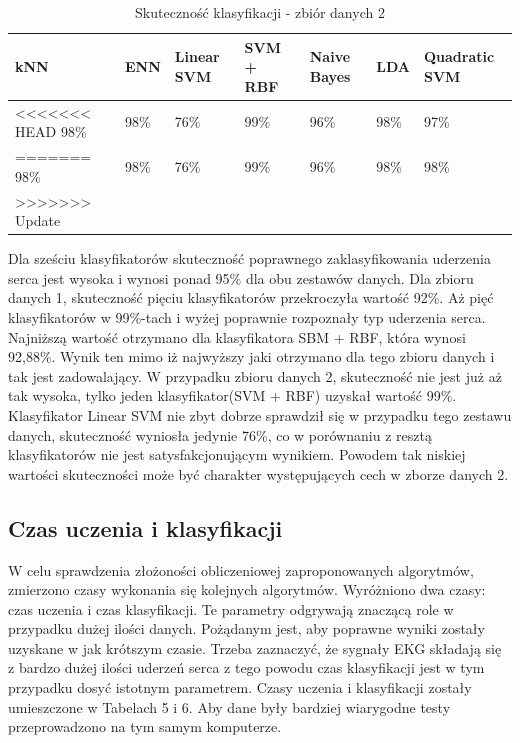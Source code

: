 \documentclass[[10pt,a4paper]{article}
\begin{document}
\begin{table}[h]
\centering
\caption{Skuteczność klasyfikacji - zbiór danych 2}
\label{accuracyTable1}
\begin{tabular}{|l|l|l|l|l|l|l|}
\hline
kNN & ENN & Linear SVM & SVM + RBF & Naive Bayes & LDA & Quadratic SVM\\ \hline
<<<<<<< HEAD
  98\%   &  98\%  & 76\%       & 99\%      & 96\%         & 98\%	& 97\%  \\ \hline
=======
  98\%   &  98\%  & 76\%       & 99\%      & 96\%         & 98\%	& 98\%  \\ \hline
>>>>>>> Update
\end{tabular}
\end{table}

Dla sześciu klasyfikatorów skuteczność poprawnego zaklasyfikowania uderzenia serca jest wysoka i wynosi ponad 95\% dla obu zestawów danych. Dla zbioru danych 1,  skuteczność pięciu klasyfikatorów przekroczyła wartość 92\%.  Aż pięć klasyfikatorów w 99\%-tach i wyżej poprawnie rozpoznały typ uderzenia serca. Najniższą wartość otrzymano dla klasyfikatora SBM + RBF, która wynosi 92,88\%. Wynik ten mimo iż najwyższy jaki otrzymano dla tego zbioru danych i tak jest zadowalający. W przypadku zbioru danych 2, skuteczność nie jest już aż tak wysoka, tylko jeden klasyfikator(SVM + RBF) uzyskał wartość 99\%. Klasyfikator Linear SVM nie zbyt dobrze sprawdził się w przypadku tego zestawu danych, skuteczność wyniosła jedynie 76\%, co w porównaniu z resztą klasyfikatorów nie jest satysfakcjonującym wynikiem. Powodem tak niskiej wartości skuteczności może być charakter występujących cech w zborze danych 2. 





\subsection{Czas uczenia i klasyfikacji}

W celu sprawdzenia złożoności obliczeniowej zaproponowanych algorytmów, zmierzono czasy wykonania się kolejnych algorytmów. Wyróżniono dwa czasy: czas uczenia i czas klasyfikacji. Te parametry odgrywają znaczącą role w przypadku dużej ilości danych. Pożądanym jest, aby poprawne wyniki zostały uzyskane w jak krótszym czasie. Trzeba zaznaczyć, że sygnały EKG składają się z bardzo dużej ilości uderzeń serca z tego  powodu czas klasyfikacji jest w tym przypadku dosyć istotnym parametrem. Czasy uczenia i klasyfikacji zostały umieszczone w Tabelach 5 i 6. Aby dane były bardziej wiarygodne testy przeprowadzono na tym samym komputerze. 
\end{document}
